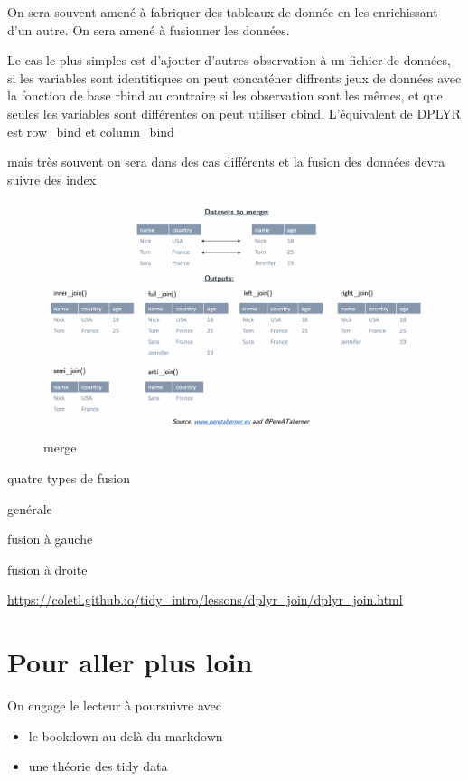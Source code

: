 \documentclass[
]{book}
\providecommand{\tightlist}{%
  \setlength{\itemsep}{0pt}\setlength{\parskip}{0pt}}
\begin{document}
On sera souvent amené à fabriquer des tableaux de donnée en les enrichissant d'un autre. On sera amené à fusionner les données.

Le cas le plus simples est d'ajouter d'autres observation à un fichier de données, si les variables sont identitiques on peut concaténer diffrents jeux de données avec la fonction de base rbind au contraire si les observation sont les mêmes, et que seules les variables sont différentes on peut utiliser cbind. L'équivalent de DPLYR est row\_bind et column\_bind

mais très souvent on sera dans des cas différents et la fusion des données devra suivre des index

\begin{figure}
\centering
\includegraphics{./Images/merge_ex-1024x624.png}
\caption{merge}
\end{figure}

quatre types de fusion

genérale

fusion à gauche

fusion à droite

\url{https://coletl.github.io/tidy_intro/lessons/dplyr_join/dplyr_join.html}

\hypertarget{pour-aller-plus-loin}{%
\section{Pour aller plus loin}\label{pour-aller-plus-loin}}

On engage le lecteur à poursuivre avec

\begin{itemize}
\tightlist
\item
  le bookdown au-delà du markdown
\item
  une théorie des tidy data
\end{itemize}
\end{document}

